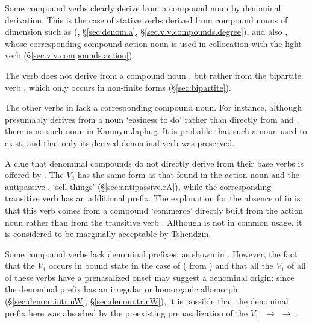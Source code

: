 Some compound verbs clearly derive from a compound noun by denominal derivation. This is the case of stative verbs derived from compound nouns of dimension such as  (, §\ref{sec:denom.a}, §\ref{sec.v.v.compounds.degree}), and also  , whose corresponding compound action noun  is used in collocation with the light verb  (§\ref{sec.v.v.compounds.action}).

The verb  does not derive from a compound noun , but rather from the bipartite verb , which only occurs in non-finite forms (§\ref{sec:bipartite}).

The other verbs in  lack a corresponding compound noun. For instance, although  presumably derives from a noun  `easiness to do' rather than directly from  and , there is no such noun in Kamnyu Japhug. It is probable that such a noun used to exist, and that only its derived denominal verb was preserved. 

A clue that denominal compounds do not directly derive from their base verbs is offered by . The $V_2$  has the same form as that found in the action noun  and the antipassive , `sell things' (§\ref{sec:antipassive.rA}), while the corresponding transitive verb  has an additional  prefix. The explanation for the absence of  in  is that this verb comes from a compound  `commerce' directly built from the action noun  rather than from the transitive verb . Although  is not in common usage, it is considered to be marginally acceptable by Tshendzin.

Some compound verbs lack denominal prefixes, as shown in . However, the fact that the $V_1$ occurs in bound state in the case of  ( from ) and that all the $V_1$ of all of these verbs have a prenasalized onset may suggest a denominal origin: since the denominal  prefix has an irregular  or homorganic  allomorph (§\ref{sec:denom.intr.nW}, §\ref{sec:denom.tr.nW}), it is possible that the denominal prefix here was absorbed by the preexisting prenasalization of the $V_1$:  $\rightarrow$  $\rightarrow$ .

